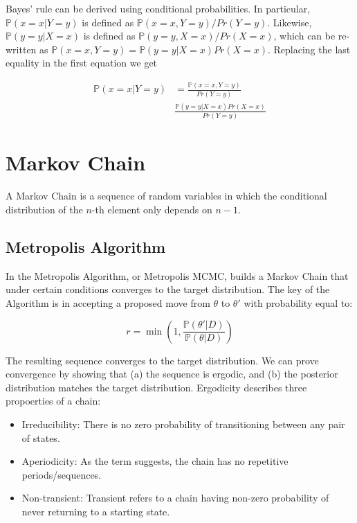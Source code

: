 \documentclass[]{book}
\begin{document}
Bayes' rule can be derived using conditional probabilities. In particular, \(\mathbb{P}{\left(x=x|Y=y\right)}\) is defined as \(\mathbb{P}{\left(x=x, Y=y\right)}/Pr{\left(Y=y\right)}\). Likewise, \(\mathbb{P}{\left(y=y|X=x\right)}\) is defined as \(\mathbb{P}{\left(y=y, X=x\right)}/Pr{\left(X=x\right)}\), which can be re-written as \(\mathbb{P}{\left(x=x, Y=y\right)} = \mathbb{P}{\left(y=y|X=x\right)}Pr{\left(X=x\right)}\). Replacing the last equality in the first equation we get

\begin{align*}
\mathbb{P}{\left(x=x|Y=y\right)} & = \frac{\mathbb{P}{\left(x=x, Y=y\right)}}{Pr{\left(Y=y\right)}} \\
& \frac{\mathbb{P}{\left(y=y|X=x\right)}Pr{\left(X=x\right)}}{Pr{\left(Y=y\right)}}
\end{align*}

\hypertarget{markov-chain}{%
\chapter{Markov Chain}\label{markov-chain}}

A Markov Chain is a sequence of random variables in which the conditional distribution of the \(n\)-th element only depends on \(n-1\).

\hypertarget{metropolis-algorithm}{%
\section{Metropolis Algorithm}\label{metropolis-algorithm}}

In the Metropolis Algorithm, or Metropolis MCMC, builds a Markov Chain that
under certain conditions converges to the target distribution. The key of the
Algorithm is in accepting a proposed move from \(\theta\) to \(\theta'\) with
probability equal to:

\begin{equation}
r = \min\left(1, \frac{\mathbb{P}{\left(\theta'|D\right)}}{\mathbb{P}{\left(\theta|D\right)}}\right)
\end{equation}

The resulting sequence converges to the target distribution. We can prove
convergence by showing that (a) the sequence is ergodic, and (b) the posterior
distribution matches the target distribution. Ergodicity describes three
propoerties of a chain:

\begin{itemize}
\item
  Irreducibility: There is no zero probability of transitioning between any pair of states.
\item
  Aperiodicity: As the term suggests, the chain has no repetitive periods/sequences.
\item
  Non-transient: Transient refers to a chain having non-zero probability of
  never returning to a starting state.
\end{itemize}
\end{document}
